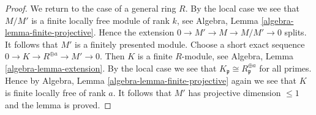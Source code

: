 \begin{proof}
\medskip\noindent
We return to the case of a general ring $R$. By the local case
we see that $M/M'$ is a finite locally free module of rank $k$, see
Algebra, Lemma \ref{algebra-lemma-finite-projective}. Hence the extension
$0 \to M' \to M \to M/M' \to 0$ splits. It follows that $M'$
is a finitely presented module. Choose a short exact sequence
$0 \to K \to R^{\oplus a} \to M' \to 0$. Then $K$ is a finite
$R$-module, see Algebra, Lemma \ref{algebra-lemma-extension}.
By the local case we see that $K_\mathfrak p \cong R_\mathfrak p^{\oplus a}$
for all primes. Hence by
Algebra, Lemma \ref{algebra-lemma-finite-projective}
again we see that $K$ is finite locally free of rank $a$.
It follows that $M'$ has projective dimension $\leq 1$
and the lemma is proved.
\end{proof}